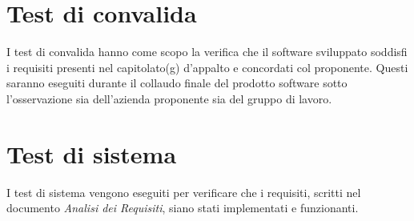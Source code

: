 \section{Test di convalida}
I test di convalida hanno come scopo la verifica che il software sviluppato soddisfi i requisiti presenti nel capitolato(g) d’appalto e concordati col proponente.
Questi saranno eseguiti durante il collaudo finale del prodotto software sotto l'osservazione sia dell'azienda proponente sia del gruppo di lavoro.

\section{Test di sistema}
I test di sistema vengono eseguiti per verificare che i requisiti, scritti nel documento \textit{Analisi dei Requisiti}, siano stati implementati e funzionanti.

